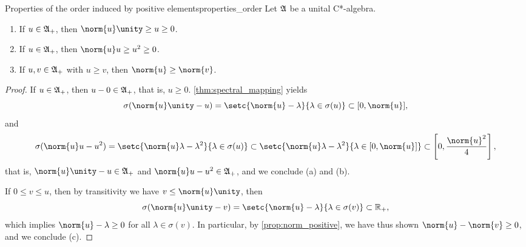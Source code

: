 \begin{proposition}{Properties of the order induced by positive elements}{properties_order}
    Let \(\mathfrak{A}\) be a unital C*-algebra.
    \begin{enumerate}[label=(\alph*)]
        \item If \(u\in\mathfrak{A}_+\), then \(\norm{u} \unity \geq u \geq 0\).
        \item If \(u \in \mathfrak{A}_+\), then \(\norm{u} u \geq u^2 \geq 0\).
        \item If \(u,v \in \mathfrak{A}_+\) with \(u \geq v\), then \(\norm{u}\geq \norm{v}\).
    \end{enumerate}
\end{proposition}
\begin{proof}
    If \(u \in \mathfrak{A}_+\), then \(u - 0 \in \mathfrak{A}_+\), that is, \(u \geq 0\). \cref{thm:spectral_mapping} yields
    \begin{equation*}
        \sigma(\norm{u} \unity - u) = \setc{\norm{u} - \lambda}{\lambda \in \sigma(u)} \subset [0, \norm{u}],
    \end{equation*}
    and
    \begin{equation*}
        \sigma(\norm{u} u - u^2) = \setc{\norm{u}\lambda - \lambda^2}{\lambda \in \sigma(u)} \subset \setc{\norm{u}\lambda - \lambda^2}{\lambda \in [0, \norm{u}]} \subset \left[0, \frac{\norm{u}^2}{4}\right],
    \end{equation*}
    that is, \(\norm{u} \unity - u \in \algebra{A}_+\) and \(\norm{u} u - u^2 \in \algebra{A}_+\), and we conclude (a) and (b).

    If \(0 \leq v \leq u\), then by transitivity we have \(v \leq \norm{u} \unity\), then
    \begin{equation*}
        \sigma(\norm{u}\unity - v) = \setc{\norm{u} - \lambda}{\lambda \in \sigma(v)} \subset \mathbb{R}_+,
    \end{equation*}
    which implies \(\norm{u} - \lambda \geq 0\) for all \(\lambda \in \sigma(v)\). In particular, by \cref{prop:norm_positive}, we have thus shown \(\norm{u} - \norm{v} \geq 0\), and we conclude (c).
\end{proof}

